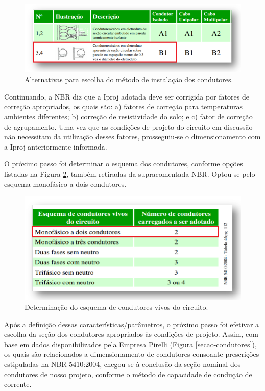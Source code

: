 \begin{figure}[h]
	\centering
	\includegraphics[scale=0.7]		{figuras/nbr.png}
	\caption{Alternativas para escolha do método de instalação dos condutores.}
	\label{metodos-condutores}
\end{figure}

 Continuando, a NBR diz que a Iproj adotada deve ser corrigida por fatores de correção apropriados, os quais são: a) fatores de correção para temperaturas ambientes diferentes; b) correção de resistividade do solo; e c) fator de correção de agrupamento. Uma vez que as condições de projeto do circuito em discussão não necessitam da utilização desses fatores, prosseguiu-se o dimensionamento com a Iproj anteriormente informada.
 
 O próximo passo foi determinar o esquema dos condutores, conforme opções listadas na Figura \ref{esquema-condutores}, também retiradas da supracomentada NBR. Optou-se pelo esquema monofásico a dois condutores.
 
 \begin{figure}[h]
	\centering
	\includegraphics[scale=0.8]		{figuras/condutores_circuito.png}
	\caption{Determinação do esquema de condutores vivos do circuito.}
	\label{esquema-condutores}
\end{figure}

Após a definição dessas características/parâmetros, o próximo passo foi efetivar a escolha da seção dos condutores apropriados às condições de projeto. Assim, com base em dados disponibilizados pela Empresa Pirelli (Figura \ref{secao-condutores}), os quais são relacionados a dimensionamento de condutores consoante prescrições estipuladas na NBR 5410:2004, chegou-se à conclusão da seção nominal dos condutores de nosso projeto, conforme o método de capacidade de condução de corrente.

